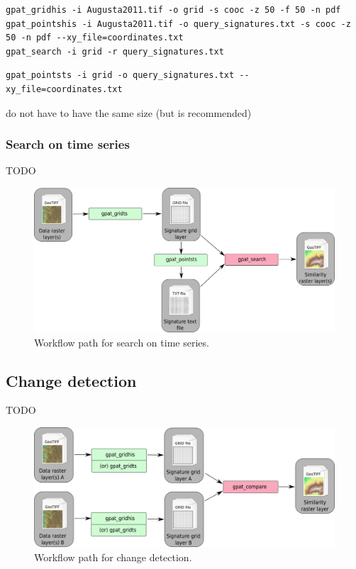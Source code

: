 \documentclass[12pt,margin=0.5in]{article}
\begin{document}
\begin{minipage}{\linewidth}
\begin{lstlisting}
gpat_gridhis -i Augusta2011.tif -o grid -s cooc -z 50 -f 50 -n pdf
gpat_pointshis -i Augusta2011.tif -o query_signatures.txt -s cooc -z 50 -n pdf --xy_file=coordinates.txt
gpat_search -i grid -r query_signatures.txt
\end{lstlisting}
\end{minipage}

\vspace{5pt}

\vspace{5pt}

\begin{lstlisting}
gpat_pointsts -i grid -o query_signatures.txt --xy_file=coordinates.txt
\end{lstlisting}

do not have to have the same size (but is recommended)

\FloatBarrier

\subsubsection{Search on time series}
TODO
\begin{figure}[H]
	\centering
	\includegraphics[width=\textwidth]{searchts_scheme.png}
	\caption{Workflow path for search on time series.}
	\label{FIG:SEARCHTS}
\end{figure}

\FloatBarrier

\subsection{Change detection}
TODO
\begin{figure}[H]
	\centering
	\includegraphics[width=\textwidth]{compare_scheme.png}
	\caption{Workflow path for change detection.}
	\label{FIG:CHANGE}
\end{figure}
\end{document}
